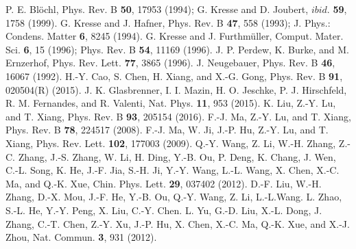 \documentclass[twocolumn,aps,showpacs,prb]{revtex4-1}
\begin{document}
\begin{thebibliography}{}
P. E. Bl\"{o}chl, Phys. Rev. B {\bf 50}, 17953 (1994); G. Kresse and D. Joubert, $ibid$. {\bf 59}, 1758 (1999).
 G. Kresse and J. Hafner, Phys. Rev. B {\bf 47}, 558 (1993); J. Phys.: Condens. Matter {\bf 6}, 8245 (1994).
 G. Kresse and J. Furthm\"{u}ller, Comput. Mater. Sci. {\bf 6}, 15 (1996); Phys. Rev. B {\bf 54}, 11169 (1996).
 J. P. Perdew, K. Burke, and M. Ernzerhof, Phys. Rev. Lett. {\bf 77}, 3865 (1996).
 J. Neugebauer, Phys. Rev. B {\bf 46}, 16067 (1992).
H.-Y. Cao, S. Chen, H. Xiang, and X.-G. Gong, Phys. Rev. B {\bf 91}, 020504(R) (2015).
J. K. Glasbrenner, I. I. Mazin, H. O. Jeschke, P. J. Hirschfeld, R. M. Fernandes, and R. Valenti, Nat. Phys. {\bf 11}, 953 (2015).
K. Liu, Z.-Y. Lu, and T. Xiang, Phys. Rev. B {\bf 93}, 205154 (2016).
 F.-J. Ma, Z.-Y. Lu, and T. Xiang, Phys. Rev. B {\bf 78}, 224517 (2008).
 F.-J. Ma, W. Ji, J.-P. Hu, Z.-Y. Lu, and T. Xiang, Phys. Rev. Lett. {\bf 102}, 177003 (2009).
 Q.-Y. Wang, Z. Li, W.-H. Zhang, Z.-C. Zhang, J.-S. Zhang, W. Li, H. Ding, Y.-B. Ou, P. Deng, K. Chang, J. Wen, C.-L. Song, K. He, J.-F. Jia, S.-H. Ji, Y.-Y. Wang, L.-L. Wang, X. Chen, X.-C. Ma, and Q.-K. Xue, Chin. Phys. Lett. {\bf 29}, 037402 (2012).
 D.-F. Liu, W.-H. Zhang, D.-X. Mou, J.-F. He, Y.-B. Ou, Q.-Y. Wang, Z. Li, L.-L.Wang. L. Zhao, S.-L. He, Y.-Y. Peng, X. Liu, C.-Y. Chen. L. Yu, G.-D. Liu, X.-L. Dong, J. Zhang, C.-T. Chen, Z.-Y. Xu, J.-P. Hu, X. Chen, X.-C. Ma, Q.-K. Xue, and X.-J. Zhou, Nat. Commun. {\bf 3}, 931 (2012).

\end{thebibliography}
\end{document}
